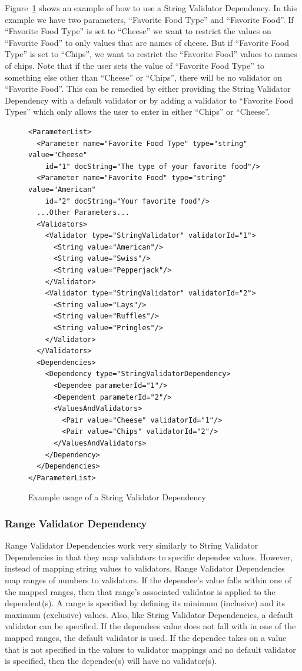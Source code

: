 Figure~\ref{StringValiDepXML} shows an example of how to use a String Validator Dependency. In this example we have two parameters, 
``Favorite Food Type''
and ``Favorite Food''. If ``Favorite Food Type'' is set to ``Cheese'' we want to restrict the values on ``Favorite Food'' to only values that are names
of cheese. But if ``Favorite Food Type'' is set to ``Chips'', we want to restrict the ``Favorite Food'' values to names of chips. Note that if the user
sets the value of ``Favorite Food Type'' to something else other than ``Cheese'' or ``Chips'', there will be no validator on ``Favorite Food''. This can
be remedied by either providing the String Validator Dependency with a default validator or by adding a validator to ``Favorite Food Types'' which only
allows the user to enter in either ``Chips'' or ``Cheese''.
\begin{figure}
\centering
{\footnotesize
\begin{Verbatim}
<ParameterList>
  <Parameter name="Favorite Food Type" type="string" value="Cheese"
    id="1" docString="The type of your favorite food"/>
  <Parameter name="Favorite Food" type="string" value="American"
    id="2" docString="Your favorite food"/>
  ...Other Parameters...
  <Validators>
    <Validator type="StringValidator" validatorId="1">
      <String value="American"/>
      <String value="Swiss"/>
      <String value="Pepperjack"/>
    </Validator>
    <Validator type="StringValidator" validatorId="2">
      <String value="Lays"/>
      <String value="Ruffles"/>
      <String value="Pringles"/>
    </Validator>
  </Validators>
  <Dependencies>
    <Dependency type="StringValidatorDependency>
      <Dependee parameterId="1"/>
      <Dependent parameterId="2"/>
      <ValuesAndValidators>
        <Pair value="Cheese" validatorId="1"/>
        <Pair value="Chips" validatorId="2"/>
      </ValuesAndValidators>
    </Dependency>
  </Dependencies>
</ParameterList>
\end{Verbatim}
}
\caption{Example usage of a String Validator Dependency}
\label{StringValiDepXML}
\end{figure}

\subsubsection{Range Validator Dependency}
Range Validator Dependencies work very similarly to String Validator Dependencies in that they map validators to specific dependee values. However,
instead of mapping string values to validators, Range Validator Dependencies map ranges of numbers to validators. If the dependee's value falls within one of the 
mapped ranges, then that range's associated validator is applied to the dependent(s). A range is specified by defining its minimum (inclusive) and its maximum (exclusive) 
values. Also, like String Validator Dependencies, a default validator can be specified. If the dependees value does not fall with in one of the mapped ranges, the default 
validator is used. If the dependee takes on a value that is not specified in the values to validator mappings and no default validator is specified, then the 
dependee(s) will have no validator(s).


